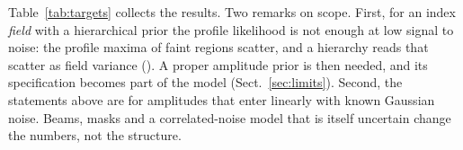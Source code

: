 Table~\ref{tab:targets} collects the results. Two remarks on scope. First, for an index \emph{field}
with a hierarchical prior the profile likelihood is not enough at low signal to noise: the profile
maxima of faint regions scatter, and a hierarchy reads that scatter as field variance
(). A proper amplitude prior is then needed, and its specification becomes part of the
model (Sect.~\ref{sec:limits}). Second, the statements above are for amplitudes that enter linearly
with known Gaussian noise. Beams, masks and a correlated-noise model that is itself uncertain change
the numbers, not the structure.
